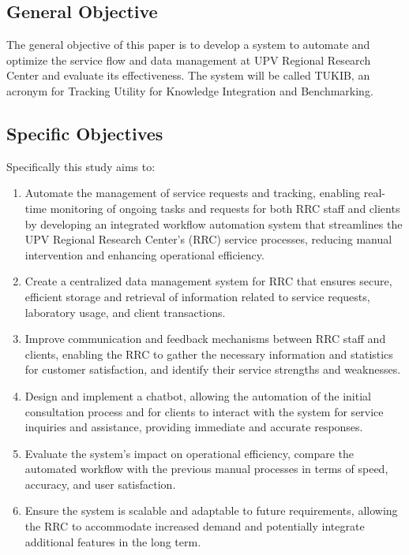 \subsection{General Objective}
\label{sec:generalobjective}

The general objective of this paper is to develop a system to automate and optimize the service flow and data management at UPV Regional Research Center and evaluate its effectiveness. The system will be called TUKIB, an acronym for Tracking Utility for Knowledge Integration and Benchmarking. 

\subsection{Specific Objectives}
\label{sec:specificobjectives}

Specifically this study aims to:

\begin{enumerate}
   \item Automate the management of service requests and tracking, enabling real-time monitoring of ongoing tasks and requests for both RRC staff and clients by developing an integrated workflow automation system that streamlines the UPV Regional Research Center's (RRC) service processes, reducing manual intervention and enhancing operational efficiency.
   
   \item Create a centralized data management system for RRC that ensures secure, efficient storage and retrieval of information related to service requests, laboratory usage, and client transactions.
   
   \item Improve communication and feedback mechanisms between RRC staff and clients, enabling the RRC to gather the necessary information and statistics for customer satisfaction, and identify their service strengths and weaknesses.
   
   \item Design and implement a chatbot, allowing the automation of the initial consultation process and for clients to interact with the system for service inquiries and assistance, providing immediate and accurate responses.
   
   \item Evaluate the system’s impact on operational efficiency, compare the automated workflow with the previous manual processes in terms of speed, accuracy, and user satisfaction.
   
   \item Ensure the system is scalable and adaptable to future requirements, allowing the RRC to accommodate increased demand and potentially integrate additional features in the long term.
   
\end{enumerate}


